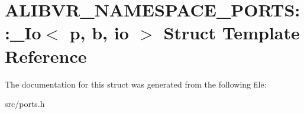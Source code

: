 \hypertarget{structALIBVR__NAMESPACE__PORTS_1_1__Io}{}\section{A\+L\+I\+B\+V\+R\+\_\+\+N\+A\+M\+E\+S\+P\+A\+C\+E\+\_\+\+P\+O\+R\+TS\+:\+:\+\_\+\+Io$<$ p, b, io $>$ Struct Template Reference}
\label{structALIBVR__NAMESPACE__PORTS_1_1__Io}


The documentation for this struct was generated from the following file\+:\begin{DoxyCompactItemize}
\item 
src/ports.\+h\end{DoxyCompactItemize}
